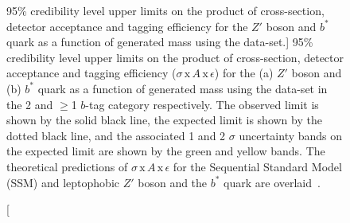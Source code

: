 \begin{figure}[!htb]
  \centering
  \captionsetup[subfigure]{aboveskip=0pt,justification=centering}
  \caption
      [95\% credibility level upper limits on the product of cross-section, detector acceptance and tagging efficiency
        for the $Z'$ boson and $b^*$ quark as a function of generated mass
        using the \summer{} data-set.]
      {95\% credibility level upper limits on
        the product of cross-section, detector acceptance and tagging efficiency ($\sigma\,\text{x}\,\mathit{A}\,\text{x}\,\epsilon$)
        for the (a) $Z'$ boson and (b) $b^*$ quark  as a function of generated mass
        using the \summer{} data-set in the 2 and $\geq$1 $b$-tag category respectively.
        The observed limit is shown by the solid black line,
        the expected limit is shown by the dotted black line,
        and the associated 1 and 2 $\sigma$ uncertainty bands on the expected limit are shown by the green and yellow bands.
        The theoretical predictions of $\sigma\,\text{x}\,\mathit{A}\,\text{x}\,\epsilon$
        for the Sequential Standard Model (SSM) and leptophobic $Z'$ boson and the $b^*$ quark are overlaid~\cite{dibjet-ichep_conf}.
      }
  \label{fig:lim-summer_benchmark}
\end{figure}

